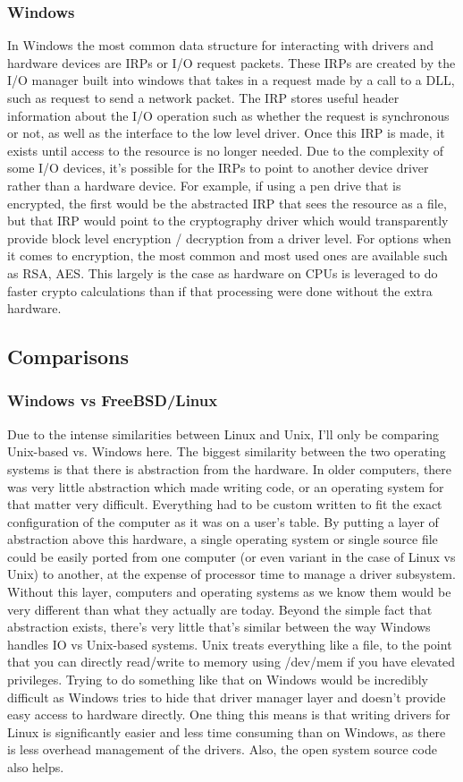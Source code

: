 \subsubsection{Windows}
In Windows the most common data structure for interacting with drivers and hardware devices are IRPs or I/O request packets. These IRPs are created by the I/O manager built into windows that takes in a request made by a call to a DLL, such as request to send a network packet. The IRP stores useful header information about the I/O operation such as whether the request is synchronous or not, as well as the interface to the low level driver. Once this IRP is made, it exists until access to the resource is no longer needed. Due to the complexity of some I/O devices, it's possible for the IRPs to point to another device driver rather than a hardware device. For example, if using a pen drive that is encrypted, the first would be the abstracted IRP that sees the resource as a file, but that IRP would point to the cryptography driver which would transparently provide block level encryption / decryption from a driver level. For options when it comes to encryption, the most common and most used ones are available such as RSA, AES. This largely is the case as hardware on CPUs is leveraged to do faster crypto calculations than if that processing were done without the extra hardware.

\subsection{Comparisons}
\subsubsection{Windows vs FreeBSD/Linux}
Due to the intense similarities between Linux and Unix, I'll only be comparing Unix-based vs. Windows here. The biggest similarity between the two operating systems is that there is abstraction from the hardware. In older computers, there was very little abstraction which made writing code, or an operating system for that matter very difficult. Everything had to be custom written to fit the exact configuration of the computer as it was on a user's table. By putting a layer of abstraction above this hardware, a single operating system or single source file could be easily ported from one computer (or even variant in the case of Linux vs Unix) to another, at the expense of processor time to manage a driver subsystem. Without this layer, computers and operating systems as we know them would be very different than what they actually are today. Beyond the simple fact that abstraction exists, there's very little that's similar between the way Windows handles IO vs Unix-based systems. Unix treats everything like a file, to the point that you can directly read/write to memory using /dev/mem if you have elevated privileges. Trying to do something like that on Windows would be incredibly difficult as Windows tries to hide that driver manager layer and doesn't provide easy access to hardware directly. One thing this means is that writing drivers for Linux is significantly easier and less time consuming than on Windows, as there is less overhead management of the drivers. Also, the open system source code also helps.